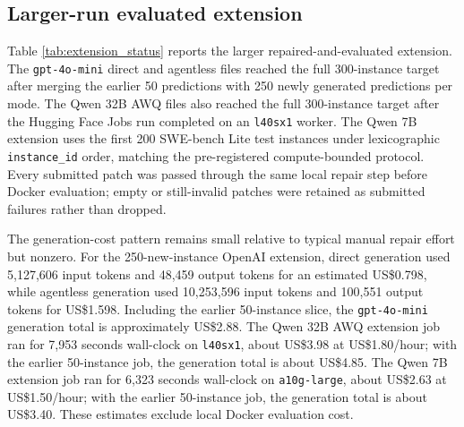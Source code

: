 \documentclass[preprint,12pt]{elsarticle}
\begin{document}
\subsection{Larger-run evaluated extension}

Table \ref{tab:extension_status} reports the larger repaired-and-evaluated extension. The \texttt{gpt-4o-mini} direct and agentless files reached the full 300-instance target after merging the earlier 50 predictions with 250 newly generated predictions per mode. The Qwen 32B AWQ files also reached the full 300-instance target after the Hugging Face Jobs run completed on an \texttt{l40sx1} worker. The Qwen 7B extension uses the first 200 SWE-bench Lite test instances under lexicographic \texttt{instance\_id} order, matching the pre-registered compute-bounded protocol. Every submitted patch was passed through the same local repair step before Docker evaluation; empty or still-invalid patches were retained as submitted failures rather than dropped.

The generation-cost pattern remains small relative to typical manual repair effort but nonzero. For the 250-new-instance OpenAI extension, direct generation used 5,127,606 input tokens and 48,459 output tokens for an estimated US\$0.798, while agentless generation used 10,253,596 input tokens and 100,551 output tokens for US\$1.598. Including the earlier 50-instance slice, the \texttt{gpt-4o-mini} generation total is approximately US\$2.88. The Qwen 32B AWQ extension job ran for 7,953 seconds wall-clock on \texttt{l40sx1}, about US\$3.98 at US\$1.80/hour; with the earlier 50-instance job, the generation total is about US\$4.85. The Qwen 7B extension job ran for 6,323 seconds wall-clock on \texttt{a10g-large}, about US\$2.63 at US\$1.50/hour; with the earlier 50-instance job, the generation total is about US\$3.40. These estimates exclude local Docker evaluation cost.
\end{document}
